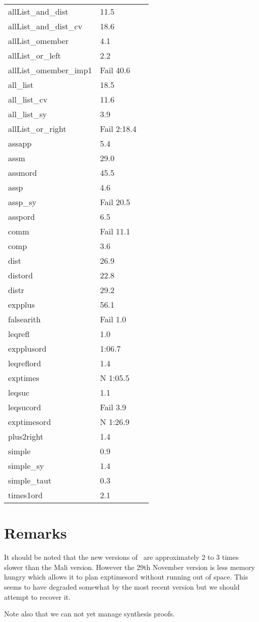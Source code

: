 \begin{center}\begin{supertabular}[t]{llp{2in}}
allList\_and\_dist & 11.5 & \\
allList\_and\_dist\_cv & 18.6 & \\
allList\_omember & 4.1 & \\
allList\_or\_left & 2.2 & \\
allList\_omember\_imp1 & Fail 40.6 & \\
all\_list & 18.5 & \\
all\_list\_cv & 11.6 & \\
all\_list\_sy & 3.9 & \\
allList\_or\_right & Fail 2:18.4 & \\
assapp & 5.4 & \\
assm & 29.0 & \\
assmord & 45.5 & \\
assp & 4.6 & \\
assp\_sy & Fail 20.5 & \\
asspord & 6.5 & \\
comm & Fail 11.1 & \\
comp & 3.6 & \\
dist & 26.9 & \\
distord & 22.8 & \\
distr & 29.2 & \\
expplus & 56.1 & \\
falsearith & Fail 1.0 & \\
leqrefl & 1.0 & \\
expplusord & 1:06.7 & \\
leqreflord & 1.4 & \\
exptimes & N 1:05.5 & \\
leqsuc & 1.1 & \\
leqsucord & Fail 3.9 & \\
exptimesord & N 1:26.9 & \\
plus2right & 1.4 & \\
simple & 0.9 & \\
simple\_sy & 1.4 & \\
simple\_taut & 0.3 & \\
times1ord & 2.1 & \\
\end{supertabular}\end{center}

\section{Remarks}
It should be noted that the new versions of \lclam\ are approximately 
2 to 3 times slower than the Mali version.  However the 29th November
version is less memory
hungry which allows it to plan exptimesord without
running out of space.  This seems to have degraded somewhat by the
most recent version but we should attempt to recover it.

Note also that we can not yet manage synthesis proofs.
